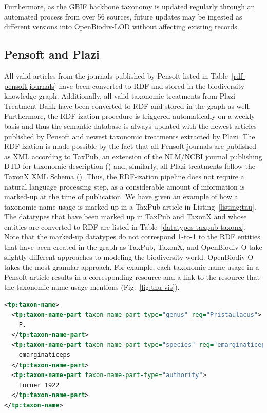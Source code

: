 Furthermore, as the GBIF backbone taxonomy is updated regularly through an automated process from over 56 sources, future updates may be ingested as different versions into OpenBiodiv-LOD without affecting existing records.

\subsection{Pensoft and Plazi}

All valid articles from the journals published by Pensoft listed in Table~\ref{rdf-pensoft-journals} have been converted to RDF and stored in the biodiversity knowledge graph. Additionally, all valid taxonomic treatments from Plazi Treatment Bank have been converted to RDF and stored in the graph as well. Furthermore, the RDF-ization procedure is triggered automatically on a weekly basis and thus the semantic database is always updated with the newest articles published by Pensoft and newest taxonomic treatments extracted by Plazi. The RDF-ization is made possible by the fact that all Pensoft journals are published as XML according to TaxPub, an extension of the NLM/NCBI journal publishing DTD for taxonomic description (\cite{catapano_taxpub:_2010}) and, similarly, all Plazi treatments follow the TaxonX XML Schema (\cite{penev_xml_2011}). Thus, the RDF-ization pipeline does not require a natural language processing step, as a considerable amount of information is marked-up at the time of publication. We have given an example of how a taxonomic name usage is marked up in a TaxPub article in Listing~\ref{listing:tnu}. The datatypes that have been marked up in TaxPub and TaxonX and whose entities are converted to RDF are listed in Table~\ref{datatypes-taxpub-taxonx}. Note that the marked-up datatypes do not correspond 1-to-1 to the RDF entities that have been created in the graph as TaxPub, TaxonX, and OpenBiodiv-O take slightly different approaches to modeling the biodiversity world. OpenBiodiv-O takes the most granular approach. For example, each taxonomic name usage in a Pensoft article results in a corresponding  resource and a link to the  resource that the taxonomic name usage mentions (Fig.~\ref{fig:tnu-vis}).

\begin{lstlisting}[language=XML,
caption=Taxonomic name usage of the name \emph{P. emarginaticeps} in Taxpub. Name parts are tagged with \cl{ tp:taxon-name-part} and the expansion of abbreviations (regularization) is marked up with the attribute \cl{reg},
label=listing:tnu, basicstyle=\ttfamily\tiny]
<tp:taxon-name>
  <tp:taxon-name-part taxon-name-part-type="genus" reg="Pristaulacus">
    P.
  </tp:taxon-name-part>
  <tp:taxon-name-part taxon-name-part-type="species" reg="emarginaticeps">
    emarginaticeps
  </tp:taxon-name-part>
  <tp:taxon-name-part taxon-name-part-type="authority">
    Turner 1922
  </tp:taxon-name-part>
</tp:taxon-name> 
\end{lstlisting}

